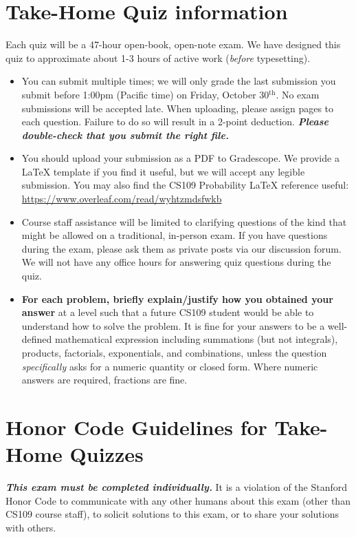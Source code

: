 \vspace*{-2em}
\section*{Take-Home Quiz information}
Each quiz will be a 47-hour open-book, open-note exam. We have designed this quiz to approximate about 1-3 hours of active work (\textit{before} typesetting). 
\vspace*{-1em}
\begin{itemize}[itemsep=0pt]
\item You can submit multiple times; we will only grade the last submission you submit before 1:00pm (Pacific time) on Friday, October 30$^\text{th}$. No exam submissions will be accepted late. When uploading, please assign pages to each question. Failure to do so will result in a 2-point deduction. \textit{\textbf{Please double-check that you submit the right file.}}
\item You should upload your submission as a PDF to Gradescope. We provide a LaTeX template if you find it useful, but we will accept any legible submission.  You may also find the CS109 Probability LaTeX reference useful: {\small \url{https://www.overleaf.com/read/wyhtzmdsfwkb}}
\item Course staff assistance will be limited to clarifying questions of the kind that might be allowed on a traditional, in-person exam. If you have questions during the exam, please ask them as private posts via our discussion forum. We will not have any office hours for answering quiz questions during the quiz.
\item \textbf{For each problem, briefly explain/justify how you obtained your answer} at a level such that a future CS109 student would be able to understand how to solve the problem. It is fine for your answers to be a well-defined mathematical expression including summations (but not integrals), products, factorials, exponentials, and combinations, unless the question \textit{specifically} asks for a numeric quantity or closed form. Where numeric answers are required, fractions are fine.
\end{itemize} 

\vspace*{-1em}
\section*{Honor Code Guidelines for Take-Home Quizzes}
\textbf{\textit{This exam must be completed individually.}} It is a violation of the Stanford Honor Code to communicate with any other humans about this exam (other than CS109 course staff), to solicit solutions to this exam, or to share your solutions with others.

